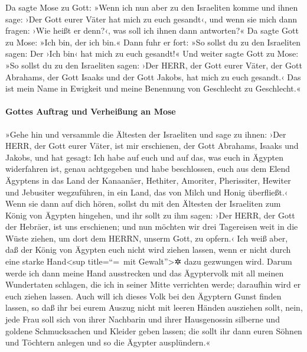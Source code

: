 Da sagte Mose zu Gott: »Wenn ich nun aber zu den
Israeliten komme und ihnen sage: ›Der Gott eurer Väter hat mich zu euch
gesandt‹, und wenn sie mich dann fragen: ›Wie heißt er denn?‹, was soll
ich ihnen dann antworten?«  Da sagte Gott zu Mose: »Ich
bin, der ich bin.« Dann fuhr er fort: »So sollst du zu den Israeliten
sagen: Der ›Ich bin‹ hat mich zu euch gesandt!«  Und
weiter sagte Gott zu Mose: »So sollst du zu den Israeliten sagen: ›Der
HERR, der Gott eurer Väter, der Gott Abrahams, der Gott Isaaks und der
Gott Jakobs, hat mich zu euch gesandt.‹ Das ist mein Name in Ewigkeit
und meine Benennung von Geschlecht zu Geschlecht.«

\hypertarget{gottes-auftrag-und-verheiuxdfung-an-mose}{%
\paragraph{Gottes Auftrag und Verheißung an
Mose}\label{gottes-auftrag-und-verheiuxdfung-an-mose}}

 »Gehe hin und versammle die Ältesten der Israeliten und
sage zu ihnen: ›Der HERR, der Gott eurer Väter, ist mir erschienen, der
Gott Abrahams, Isaaks und Jakobs, und hat gesagt: Ich habe auf euch und
auf das, was euch in Ägypten widerfahren ist, genau achtgegeben
 und habe beschlossen, euch aus dem Elend Ägyptens in das
Land der Kanaanäer, Hethiter, Amoriter, Pherissiter, Hewiter und
Jebusiter wegzuführen, in ein Land, das von Milch und Honig überfließt.‹
 Wenn sie dann auf dich hören, sollst du mit den Ältesten
der Israeliten zum König von Ägypten hingehen, und ihr sollt zu ihm
sagen: ›Der HERR, der Gott der Hebräer, ist uns erschienen; und nun
möchten wir drei Tagereisen weit in die Wüste ziehen, um dort dem HERRN,
unserm Gott, zu opfern.‹  Ich weiß aber, daß der König
von Ägypten euch nicht wird ziehen lassen, wenn er nicht durch eine
starke Hand\textless sup title=``=~mit Gewalt''\textgreater✲ dazu
gezwungen wird.  Darum werde ich dann meine Hand
ausstrecken und das Ägyptervolk mit all meinen Wundertaten schlagen, die
ich in seiner Mitte verrichten werde; daraufhin wird er euch ziehen
lassen.  Auch will ich dieses Volk bei den Ägyptern Gunst
finden lassen, so daß ihr bei eurem Auszug nicht mit leeren Händen
ausziehen sollt,  nein, jede Frau soll sich von ihrer
Nachbarin und ihrer Hausgenossin silberne und goldene Schmucksachen und
Kleider geben lassen; die sollt ihr dann euren Söhnen und Töchtern
anlegen und so die Ägypter ausplündern.«

